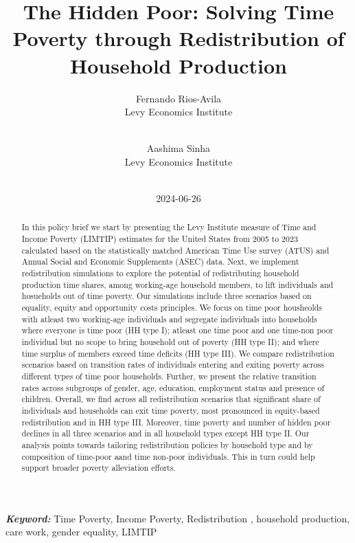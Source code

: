 \documentclass[
  11pt,
]{article}
\title{The Hidden Poor: Solving Time Poverty through Redistribution of
Household Production}
\author{
Fernando Rios-Avila\\
Levy Economics Institute\\
\\
\and 
Aashima Sinha\\
Levy Economics Institute\\
\\
}
\date{2024-06-26}
\begin{document}
\def\spacingset#1{\renewcommand{\baselinestretch}%
{#1}\small\normalsize} \spacingset{1}


\maketitle
\begin{abstract}
In this policy brief we start by presenting the Levy Institute measure
of Time and Income Poverty (LIMTIP) estimates for the United States from
2005 to 2023 calculated based on the statistically matched American Time
Use survey (ATUS) and Annual Social and Economic Supplements (ASEC)
data. Next, we implement redistribution simulations to explore the
potential of redistributing household production time shares, among
working-age household members, to lift individuals and hosueholds out of
time poverty. Our simulations include three scenarios based on equality,
equity and opportunity costs principles. We focus on time poor
housheolds with atleast two working-age individuals and segregate
individuals into households where everyone is time poor (HH type I);
atleast one time poor and one time-non poor individual but no scope to
bring household out of poverty (HH type II); and where time surplus of
members exceed time deficits (HH type III). We compare redistribution
scenarios based on transition rates of individuals entering and exiting
poverty across different types of time poor households. Further, we
present the relative transition rates across subgroups of gender, age,
education, employment status and presence of children. Overall, we find
across all redistribution scenarios that significant share of
individuals and households can exit time poverty, most pronounced in
equity-based redistribution and in HH type III. Moreover, time poverty
and number of hidden poor declines in all three scenarios and in all
household types except HH type II. Our analysis points towards tailoring
redistribution policies by household type and by composition of
time-poor aand time non-poor individuals. This in turn could help
support broader poverty alleviation efforts.
\end{abstract}
 
\vspace{.2in}

\textbf{\textit{Keyword: }}Time Poverty, Income Poverty, Redistribution
, household production, care work, gender equality, LIMTIP


\thispagestyle{empty}
\clearpage{}
\newpage
\spacingset{1.2} %
\end{document}
